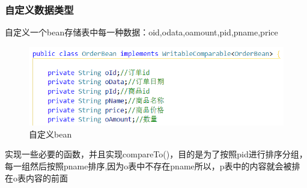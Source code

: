 \documentclass[a4paper,UTF8]{article}
\numberwithin{equation}{section}
\begin{document}
\subsubsection{自定义数据类型}
自定义一个bean存储表中每一种数据：oid,odata,oamount,pid,pname,price
\begin{figure}[H]
    \centering

    \includegraphics[width = 15cm]{bean1.png}

    \caption{自定义bean}
\end{figure}
实现一些必要的函数，并且实现compareTo()，目的是为了按照pid进行排序分组，每一组然后按照pname排序,因为o表中不存在pname所以，p表中的内容就会被排在o表内容的前面
\end{document}
